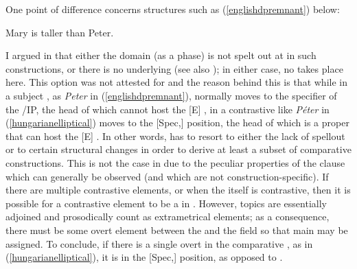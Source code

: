 One point of difference concerns structures such as (\ref{englishdpremnant}) below:

\ea	Mary is taller than Peter. \label{englishdpremnant}
\z

I argued in  that either the  domain (as a phase) is not spelt out at  in such constructions, or there is no underlying  (see also \citealt{bacskaiatkari2014alh}); in either case, no  takes place here. This option was not attested for  and the reason behind this is that while in  a subject , as \textit{Peter} in (\ref{englishdpremnant}), normally moves to the specifier of the /IP, the head of which cannot host the [E] , in  a contrastive  like \textit{Péter} in (\ref{hungarianelliptical}) moves to the [Spec,] position, the head of which is a proper  that can host the [E] . In other words,  has to resort to either the lack of spellout or to certain structural changes in order to derive at least a subset of comparative constructions. This is not the case in  due to the peculiar properties of the  clause which can generally be observed (and which are not construction-specific). If there are multiple contrastive elements, or when the  itself is contrastive, then it is possible for a contrastive element to be a  in . However, topics are essentially adjoined and prosodically count as extrametrical elements; as a consequence, there must be some overt element between the  and the  field so that main  may be assigned. To conclude, if there is a single overt  in the  comparative , as in (\ref{hungarianelliptical}), it is in the [Spec,] position, as opposed to .

